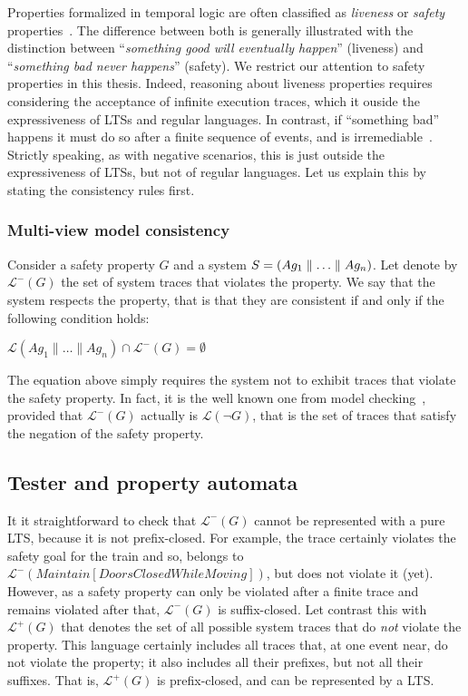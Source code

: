 Properties formalized in temporal logic are often classified as \emph{liveness} or \emph{safety} properties~\cite{Alpern:1986}. The difference between both is generally illustrated with the distinction between ``\emph{something good will eventually happen}'' (liveness) and  ``\emph{something bad never happens}'' (safety). We restrict our attention to safety properties in this thesis. Indeed, reasoning about liveness properties requires considering the acceptance of infinite execution traces, which it ouside the expressiveness of LTSs and regular languages. In contrast, if ``something bad'' happens it must do so after a finite sequence of events, and is irremediable~\cite{Alpern:1986, Giannakopoulou:1999}. Strictly speaking, as with negative scenarios, this is just outside the expressiveness of LTSs, but not of regular languages. Let us explain this by stating the consistency rules first.

\subsubsection*{Multi-view model consistency}

Consider a safety property $G$ and a system $S = (Ag_1 \parallel \ldots \parallel Ag_n)$. Let denote by $\mathcal{L}^{-}(G)$ the set of system traces that violates the property. We say that the system respects the property, that is that they are consistent if and only if the following condition holds:

\begin{center}
$\mathcal{L}(Ag_1 \parallel \ldots \parallel Ag_n) \cap \mathcal{L}^{-}(G) = \emptyset$
\end{center}

The equation above simply requires the system not to exhibit traces that violate the safety property. In fact, it is the well known one from model checking~\cite{Clarke:1989}, provided that $\mathcal{L}^{-}(G)$ actually is $\mathcal{L}(\neg G)$, that is the set of traces that satisfy the negation of the safety property.

\subsection{Tester and property automata}

It it straightforward to check that $\mathcal{L}^{-}(G)$ cannot be represented with a pure LTS, because it is not prefix-closed. For example, the trace  certainly violates the safety goal for the train and so, belongs to $\mathcal{L}^{-}(Maintain[DoorsClosed While Moving])$, but  does not violate it (yet). However, as a safety property can only be violated after a finite trace and remains violated after that, $\mathcal{L}^{-}(G)$ is suffix-closed. Let contrast this with $\mathcal{L}^{+}(G)$ that denotes the set of all possible system traces that do \emph{not} violate the property. This language certainly includes all traces that, at one event near, do not violate the property; it also includes all their prefixes, but not all their suffixes. That is, $\mathcal{L}^{+}(G)$ is prefix-closed, and can be represented by a LTS. 

